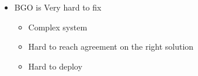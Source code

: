 \begin{itemize}
\begin{itemize}
        \end{itemize}
    \item BGO is Very hard to fix
        \begin{itemize}
            \item Complex system
            \item Hard to reach agreement on the right solution
            \item Hard to deploy
        \end{itemize}
\end{itemize}
